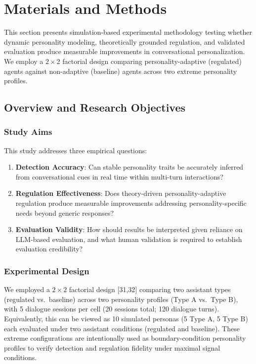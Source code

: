 \section{Materials and Methods}\label{materials-and-methods}

This section presents simulation-based experimental methodology testing whether dynamic personality modeling, theoretically grounded regulation, and validated evaluation produce measurable improvements in conversational personalization. We employ a $2 \times 2$ factorial design comparing personality-adaptive (regulated) agents against non-adaptive (baseline) agents across two extreme personality profiles.

\subsection{Overview and Research Objectives}\label{overview-and-research-objectives}

\subsubsection{Study Aims}\label{study-aims}

This study addresses three empirical questions:

\begin{enumerate}
\def\labelenumi{\arabic{enumi}.}
\item
  \textbf{Detection Accuracy}: Can stable personality traits be accurately inferred from conversational cues in real time within multi-turn interactions?
\item
  \textbf{Regulation Effectiveness}: Does theory-driven personality-adaptive regulation produce measurable improvements addressing personality-specific needs beyond generic responses?
\item
  \textbf{Evaluation Validity}: How should results be interpreted given reliance on LLM-based evaluation, and what human validation is required to establish evaluation credibility?
\end{enumerate}

\subsubsection{Experimental Design}\label{experimental-design}

We employed a $2 \times 2$ factorial design {[}31,32{]} comparing two assistant types (regulated vs.~baseline) across two personality profiles (Type A vs.~Type B), with 5 dialogue sessions per cell (20 sessions total; 120 dialogue turns). Equivalently, this can be viewed as 10 simulated personas (5 Type A, 5 Type B) each evaluated under two assistant conditions (regulated and baseline). These extreme configurations are intentionally used as boundary-condition personality profiles to verify detection and regulation fidelity under maximal signal conditions.

